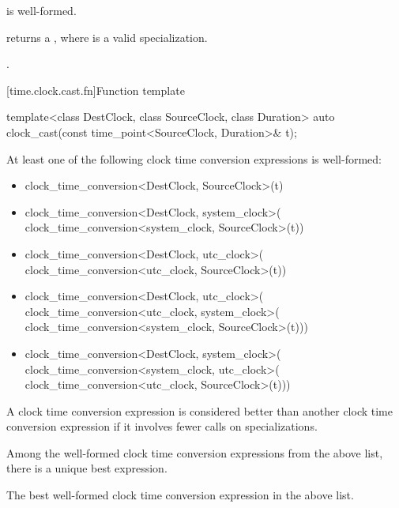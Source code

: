\begin{itemdescr}
\pnum
\constraints
{} is well-formed.

\pnum
\mandates
{} returns a ,
where  is a valid  specialization.

\pnum
\returns
{}.
\end{itemdescr}

[time.clock.cast.fn]{Function template }

%
\begin{itemdecl}
template<class DestClock, class SourceClock, class Duration>
  auto clock_cast(const time_point<SourceClock, Duration>& t);
\end{itemdecl}

\begin{itemdescr}
\pnum
\constraints
At least one of the following clock time conversion expressions
is well-formed:
\begin{itemize}
\item
\begin{codeblock}
clock_time_conversion<DestClock, SourceClock>{}(t)
\end{codeblock}

\item
\begin{codeblock}
clock_time_conversion<DestClock, system_clock>{}(
  clock_time_conversion<system_clock, SourceClock>{}(t))
\end{codeblock}

\item
\begin{codeblock}
clock_time_conversion<DestClock, utc_clock>{}(
  clock_time_conversion<utc_clock, SourceClock>{}(t))
\end{codeblock}

\item
\begin{codeblock}
clock_time_conversion<DestClock, utc_clock>{}(
  clock_time_conversion<utc_clock, system_clock>{}(
    clock_time_conversion<system_clock, SourceClock>{}(t)))
\end{codeblock}

\item
\begin{codeblock}
clock_time_conversion<DestClock, system_clock>{}(
  clock_time_conversion<system_clock, utc_clock>{}(
    clock_time_conversion<utc_clock, SourceClock>{}(t)))
\end{codeblock}
\end{itemize}

A clock time conversion expression is considered better than
another clock time conversion expression if it involves fewer
 calls on 
specializations.

\pnum
\mandates
Among the well-formed clock time conversion expressions
from the above list, there is a unique best expression.

\pnum
\returns
The best well-formed clock time conversion expression in the above list.
\end{itemdescr}

